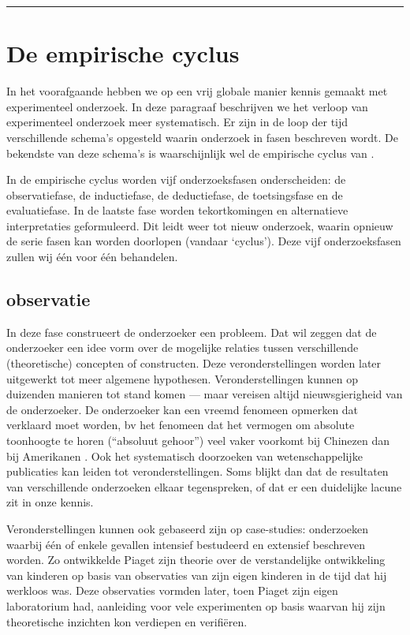 \documentclass[
]{book}
\begin{document}
\begin{center}\rule{0.5\linewidth}{0.5pt}\end{center}

\section{De empirische cyclus}\label{sec:empirischecyclus}

In het voorafgaande hebben we op een vrij
globale manier kennis gemaakt met experimenteel onderzoek. In deze
paragraaf beschrijven we het verloop van experimenteel onderzoek meer
systematisch. Er zijn in de loop der tijd verschillende schema's
opgesteld waarin onderzoek in fasen beschreven wordt. De bekendste van
deze schema's is waarschijnlijk wel de empirische cyclus van \citep{Groot61}.

In de empirische cyclus worden vijf onderzoeksfasen onderscheiden: de
observatiefase, de inductiefase, de deductiefase, de toetsingsfase en de
evaluatiefase. In de laatste fase worden tekortkomingen en alternatieve
interpretaties geformuleerd. Dit leidt weer tot nieuw onderzoek, waarin
opnieuw de serie fasen kan worden doorlopen (vandaar `cyclus'). Deze
vijf onderzoeksfasen zullen wij één voor één behandelen.

\subsection{observatie}\label{observatie}

In deze fase construeert de onderzoeker een probleem. Dat wil zeggen dat
de onderzoeker een idee vorm over de mogelijke relaties tussen
verschillende (theoretische) concepten of constructen. Deze
veronderstellingen worden later uitgewerkt tot meer algemene hypothesen.
Veronderstellingen kunnen op duizenden manieren tot stand komen --- maar
vereisen altijd nieuwsgierigheid van de onderzoeker. De onderzoeker kan
een vreemd fenomeen opmerken dat verklaard moet worden, bv het fenomeen
dat het vermogen om absolute toonhoogte te horen (``absoluut gehoor'')
veel vaker voorkomt bij Chinezen dan bij Amerikanen \citep{Deut06}. Ook het
systematisch doorzoeken van wetenschappelijke publicaties kan leiden tot
veronderstellingen. Soms blijkt dan dat de resultaten van verschillende
onderzoeken elkaar tegenspreken, of dat er een duidelijke lacune zit in
onze kennis.

Veronderstellingen kunnen ook gebaseerd zijn op case-studies:
onderzoeken waarbij één of enkele gevallen intensief bestudeerd en
extensief beschreven worden. Zo ontwikkelde Piaget zijn theorie over de
verstandelijke ontwikkeling van kinderen op basis van observaties van
zijn eigen kinderen in de tijd dat hij werkloos was. Deze observaties
vormden later, toen Piaget zijn eigen laboratorium had, aanleiding voor
vele experimenten op basis waarvan hij zijn theoretische inzichten kon
verdiepen en verifiëren.
\end{document}
